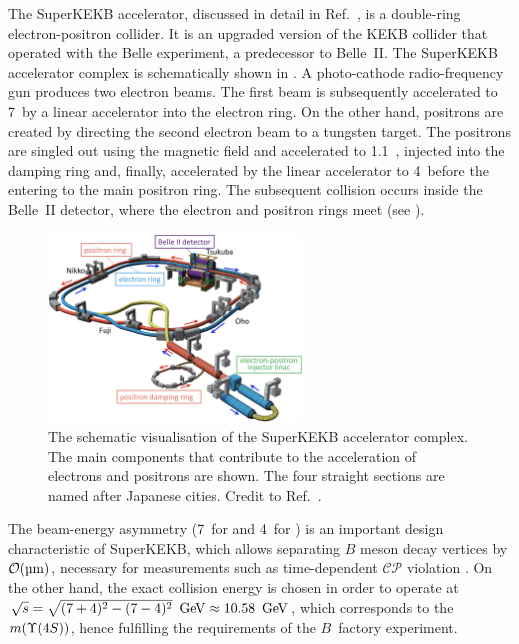 The SuperKEKB accelerator, discussed in detail in Ref.~\cite{Akai:2018mbz}, is a double-ring electron-positron collider.
It is an upgraded version of the KEKB collider \cite{Oide:2009zz} that operated with the Belle experiment, a predecessor to Belle~II.
The SuperKEKB accelerator complex is schematically shown in .
A photo-cathode radio-frequency gun produces two electron beams.
The first beam is subsequently accelerated to 7~\gev by a linear accelerator into the electron ring.
On the other hand, positrons are created by directing the second electron beam to a tungsten target.
The positrons are singled out using the magnetic field and accelerated to 1.1~\gev, injected into the damping ring and, finally,
accelerated by the linear accelerator to 4~\gev before the entering to the main positron ring.
The subsequent collision occurs inside the Belle~II detector, where the electron and positron rings meet (see ).
\begin{figure}[htbp!]
    \centering
    \includegraphics[width=0.6\textwidth]{figures/experimental_setup/super_kekb.png}
    \caption{\label{fig:superkekb}
        The schematic visualisation of the SuperKEKB accelerator complex.
        The main components that contribute to the acceleration of electrons and positrons are shown.
        The four straight sections are named after Japanese cities.
        Credit to Ref.~\cite{Akai:2018mbz}.
    }
\end{figure}

The beam-energy asymmetry (7~\gev for \en and 4~\gev for \ep) is an important design characteristic of SuperKEKB, 
which allows separating $B$ meson decay vertices by ${\cal O}(\si{\micro\meter})$, necessary for measurements such as time-dependent $\mathcal{CP}$ violation \cite{BaBar:2014omp}.
On the other hand, the exact collision energy is chosen in order to operate at $\sqrt{s}=\sqrt{(7+4)^2-(7-4)^2}~\mathrm{\,Ge\kern -0.1em V}\approx10.58~\mathrm{\,Ge\kern -0.1em V}$, which corresponds to the $m(\FourS)$, 
hence fulfilling the requirements of the $B$~factory experiment.

